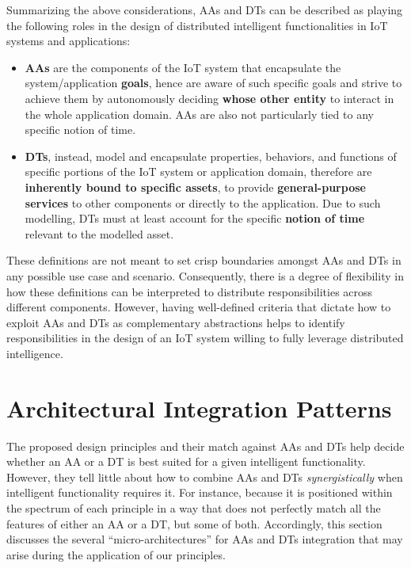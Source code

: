 Summarizing the above considerations, AAs and DTs can be described as playing the following roles in the design of distributed intelligent functionalities in IoT systems and applications:
\begin{itemize}
    \item \textbf{AAs} are the components of the IoT system that encapsulate the system/application \textbf{goals}, hence are aware of such specific goals and strive to achieve them by autonomously deciding \textbf{whose other entity} to interact in the whole application domain. 
    AAs are also not particularly tied to any specific notion of time. 
    \item \textbf{DTs}, instead, model and encapsulate properties, behaviors, and functions of specific portions of the IoT system or application domain, therefore are \textbf{inherently bound to specific assets}, to provide \textbf{general-purpose services} to other components or directly to the application. 
    Due to such modelling, DTs must at least account for the specific \textbf{notion of time} relevant to the modelled asset. 
\end{itemize}

%
These definitions are not meant to set crisp boundaries amongst AAs and DTs in any possible use case and scenario. 
%
Consequently, there is a degree of flexibility in how these definitions can be interpreted to distribute responsibilities across different components.
%
However, having well-defined criteria that dictate how to exploit AAs and DTs as complementary abstractions helps to identify responsibilities in the design of an IoT system willing to fully leverage distributed intelligence.

\section{Architectural Integration Patterns}
\label{sec:mas+dt:patterns}

The proposed design principles and their match against AAs and DTs help decide whether an AA or a DT is best suited for a given intelligent functionality. 
However, they tell little about how to combine AAs and DTs \emph{synergistically} when intelligent functionality requires it. 
For instance, because it is positioned within the spectrum of each principle in a way that does not perfectly match all the features of either an AA or a DT, but some of both. 
Accordingly, this section discusses the several ``micro-architectures''  for AAs and DTs integration that may arise during the application of our principles.

